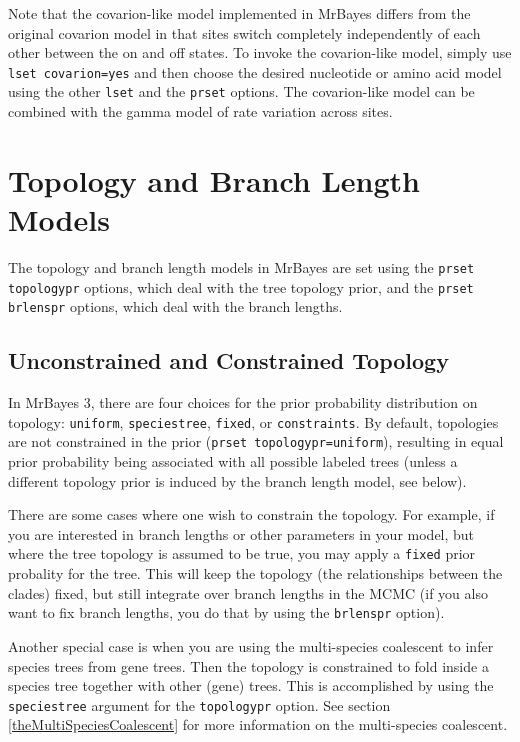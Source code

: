 \documentclass[12pt]{book}
\begin{document}
Note that the covarion-like model implemented in MrBayes differs from the original covarion model
in that sites switch completely independently of each other between the on and off states. To
invoke the covarion-like model, simply use \texttt{lset covarion=yes} and then choose the desired
nucleotide or amino acid model using the other \texttt{lset} and the \texttt{prset} options. The
covarion-like model can be combined with the gamma model of rate variation across sites.


\section{Topology and Branch Length Models}

The topology and branch length models in MrBayes are set using the \texttt{prset topologypr}
options, which deal with the tree topology prior, and the \texttt{prset brlenspr} options, which
deal with the branch lengths.

\subsection{Unconstrained and Constrained Topology}
\label{unconstrainedAndConstrainedTopology}

In MrBayes 3, there are four choices for the prior probability distribution on topology:
\texttt{uniform}, \texttt{speciestree}, \texttt{fixed}, or \texttt{constraints}. By default,
topologies are not constrained in the prior (\texttt{prset topologypr=uniform}), resulting in equal
prior probability being associated with all possible labeled trees (unless a different topology
prior is induced by the branch length model, see below).

There are some cases where one wish to constrain the topology. For example, if you are interested
in branch lengths or other parameters in your model, but where the tree topology is assumed to be
true, you may apply a \texttt{fixed} prior probality for the tree. This will keep the topology (the
relationships between the clades) fixed, but still integrate over branch lengths in the MCMC (if
you also want to fix branch lengths, you do that by using the \texttt{brlenspr} option).

Another special case is when you are using the multi-species coalescent to infer species trees from
gene trees. Then the topology is constrained to fold inside a species tree together with other
(gene) trees. This is accomplished by using the \texttt{speciestree} argument for the
\texttt{topologypr} option. See section \ref{theMultiSpeciesCoalescent} for more information on the
multi-species coalescent.
\end{document}
